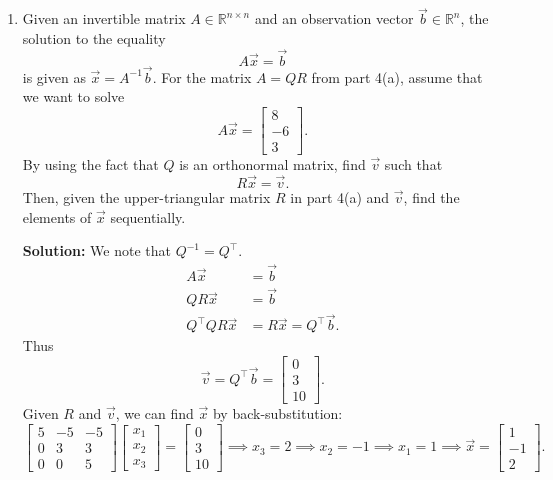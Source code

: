 \documentclass[10pt]{article}
\theoremstyle{definition}
\theoremstyle{plain}
\newcommand{\RR}{\mathbb{R}}
\newcommand{\vv}[1]{\vec{#1}}
\begin{document}
\begin{enumerate}[label=(\alph*)]
\item Given an invertible matrix $A \in \RR^{n \times n}$ and an observation vector $\vv{b} \in \RR^n$, the solution to the equality
\begin{equation}
A\vv{x} = \vv{b}
\end{equation}
is given as $\vv{x} = A^{-1}\vv{b}$. For the matrix $A = QR$ from part 4(a), assume that we want to solve
\begin{equation}
A\vv{x} = \begin{bmatrix} 8 \\ -6 \\ 3 \end{bmatrix}.
\end{equation}
By using the fact that $Q$ is an orthonormal matrix, find $\vv{v}$ such that
\begin{equation}
R\vv{x} = \vv{v}.
\end{equation}
Then, given the upper-triangular matrix $R$ in part 4(a) and $\vv{v}$, find the elements of $\vv{x}$ sequentially.

\textbf{Solution:} We note that $Q^{-1} = Q^\top$.
\begin{align}
A\vv{x} &= \vv{b} \\
QR\vv{x} &= \vv{b} \\
Q^\top QR\vv{x} &= R\vv{x} = Q^\top \vv{b}.
\end{align}
Thus
\begin{equation}
\vv{v} = Q^\top \vv{b} = \begin{bmatrix} 0 \\ 3 \\ 10 \end{bmatrix}.
\end{equation}
Given $R$ and $\vv{v}$, we can find $\vv{x}$ by back-substitution:
\begin{equation}
\begin{bmatrix} 5 & -5 & -5 \\ 0 & 3 & 3 \\ 0 & 0 & 5 \end{bmatrix} \begin{bmatrix} x_1 \\ x_2 \\ x_3 \end{bmatrix} = \begin{bmatrix} 0 \\ 3 \\ 10 \end{bmatrix} \implies x_3 = 2 \implies x_2 = -1 \implies x_1 = 1 \implies \vv{x} = \begin{bmatrix} 1 \\ -1 \\ 2 \end{bmatrix}.
\end{equation}


\end{enumerate}
\end{document}
